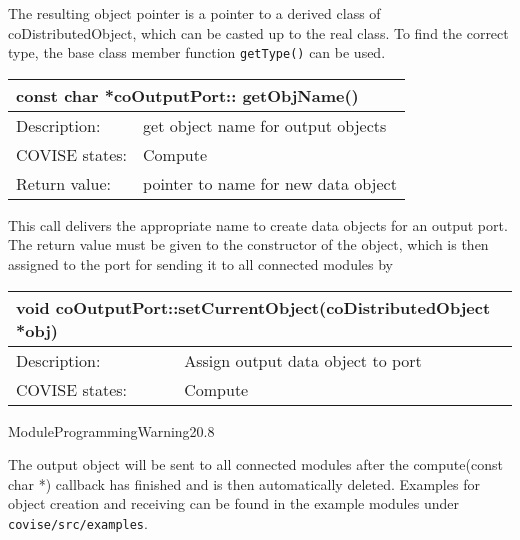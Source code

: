 The resulting object pointer is a pointer to a derived class of  coDistributedObject, which
can be casted up to the real class. To find the correct type, the base class member 
function {\tt getType()} can be used. 


\begin{longtable}{|p{4cm}|p{10cm}|}
\hline
\multicolumn{2}{|p{13.5cm}|}{\bf const char *coOutputPort:: getObjName()} \\
\hline
{Description:}   
                        & {get object name for output objects} \\
\hline
{COVISE states:} & {Compute} \\
\hline
{Return value:}  
                        & {pointer to name for new data object} \endhead
\hline
\end{longtable}

This call delivers the appropriate name to create data objects for an output port. 
The return value must be given to the constructor of the object, which is then assigned 
to the port for sending it to all connected modules by

\begin{longtable}{|p{4cm}|p{10cm}|}
\hline
\multicolumn{2}{|p{13.5cm}|}{\bf void coOutputPort::setCurrentObject(coDistributedObject *obj)} \\
\hline
{Description:}   
                       & {Assign output data object to port} \\
\hline
{COVISE states:} & {Compute} \\
\hline
\end{longtable}


\begin{covimgpath}{ModuleProgramming}{Warning2}{0.8} \end{covimgpath}

The output object will be sent to all connected modules after the compute(const char *) callback 
has finished and is then automatically deleted. Examples for object creation and 
receiving can be found in the example modules under {\tt covise/src/examples}.

